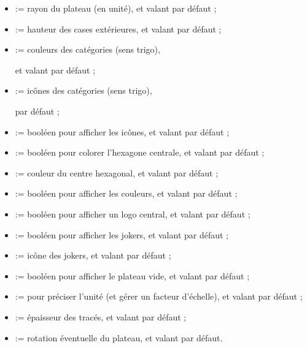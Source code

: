 \documentclass[11pt,a4paper]{ltxdoc}
\begin{document}
\begin{itemize}
	\item {} := rayon du plateau (en unité), et valant  par défaut ;
	\item {} := hauteur des cases extérieures, et valant  par défaut ;
	\item {} := couleurs des catégories (sens trigo),
	
	\hfill{}et valant  par défaut ;
	\item {} := icônes des catégories (sens trigo),
	
	\hfill{} par défaut ;
	\item {} := booléen pour afficher les icônes, et valant  par défaut ;
	\item {} := booléen pour colorer l'hexagone centrale, et valant  par défaut ;
	\item {} := couleur du centre hexagonal, et valant  par défaut ;
	\item {} := booléen pour afficher les couleurs, et valant  par défaut ;
	\item {} := booléen pour afficher un logo central, et valant  par défaut ;
	\item {} := booléen pour afficher les jokers, et valant  par défaut ;
	\item {} := icône des jokers, et valant  par défaut ;
	\item {} := booléen pour afficher le plateau vide, et valant  par défaut ;
	\item {} := pour préciser l'unité (et gérer un facteur d'échelle), et valant  par défaut ;
	\item {} := épaisseur des tracés, et valant \MontreCode{0.8pt} par défaut ;
	\item {} := rotation éventuelle du plateau, et valant  par défaut.
\end{itemize}
\end{document}
